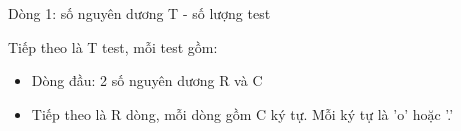 Dòng 1: số nguyên dương T - số lượng test

Tiếp theo là T test, mỗi test gồm:
\begin{itemize}
	\item Dòng đầu: 2 số nguyên dương R và C
	\item Tiếp theo là R dòng, mỗi dòng gồm C ký tự. Mỗi ký tự là 'o' hoặc '.'
\end{itemize}